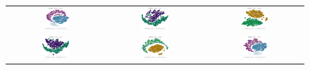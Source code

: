 \begin{figure}[hb!]
    \centering
    \begin{tabular}{ccc} 
      \includegraphics[width=0.33\textwidth]{imgs/MOSEI/audio_to_video/plots/tsne_embeddings_with_reconstructions.png} & 
      \includegraphics[width=0.33\textwidth]{imgs/MOSEI/audio_to_text/plots/tsne_embeddings_with_reconstructions.png} & 
      \includegraphics[width=0.33\textwidth]{imgs/MOSEI/video_to_audio/plots/tsne_embeddings_with_reconstructions.png}  \\
      
      \includegraphics[width=0.33\textwidth]{imgs/MOSEI/video_to_text/plots/tsne_embeddings_with_reconstructions.png} & 
      \includegraphics[width=0.33\textwidth]{imgs/MOSEI/text_to_audio/plots/tsne_embeddings_with_reconstructions.png} & 
      \includegraphics[width=0.33\textwidth]{imgs/MOSEI/text_to_video/plots/tsne_embeddings_with_reconstructions.png}  \\ 
      

\end{tabular}
\end{figure}
